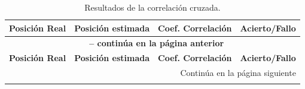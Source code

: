 \documentclass[spanish,openright]{book}
\begin{document}
\begin{center}
	\begin{longtable}{|c|c|c|c|}
    \caption[Resultados de la correlación cruzada.]{Resultados de la correlación cruzada.} \label{table2} \\
    
    \hline \multicolumn{1}{|c|}{\textbf{Posición Real}} & \multicolumn{1}{c|}{\textbf{Posición estimada}} & \multicolumn{1}{c|}{\textbf{Coef. Correlación}} & \multicolumn{1}{c|}{\textbf{Acierto/Fallo}} \\ \hline 
    \endfirsthead
    
    \multicolumn{4}{c}{{\bfseries \tablename\ \thetable{} -- continúa en la página anterior}} \\
    \hline \multicolumn{1}{|c|}{\textbf{Posición Real}} & \multicolumn{1}{c|}{\textbf{Posición estimada}} & \multicolumn{1}{c|}{\textbf{Coef. Correlación}} & \multicolumn{1}{c|}{\textbf{Acierto/Fallo}} \\ \hline 
    \endhead
    
    \hline \multicolumn{4}{|r|}{{Continúa en la página siguiente}} \\ \hline
    \endfoot

    \hline \hline
    \endlastfoot
    

\end{longtable}
\end{center}
\end{document}
